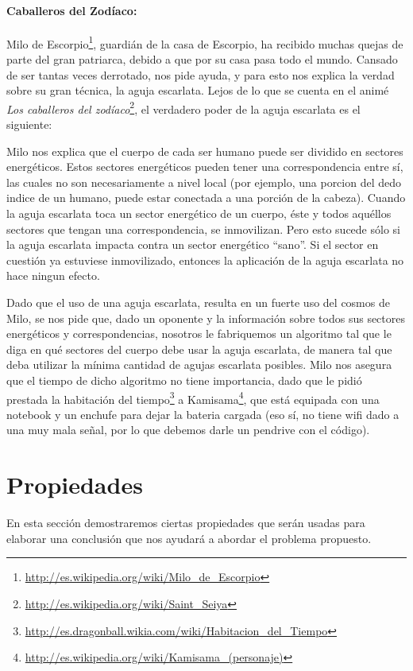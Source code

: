 \documentclass[a4paper]{article}
\begin{document}
\paragraph{Caballeros del Zodíaco:} Milo de Escorpio\footnote{\url{http://es.wikipedia.org/wiki/Milo_de_Escorpio}}, guardián de la casa de Escorpio, ha recibido muchas quejas de parte del gran patriarca, debido a que por su casa pasa todo el mundo. Cansado de ser tantas veces derrotado, nos pide ayuda, y para esto nos explica la verdad sobre su gran técnica, la aguja escarlata. Lejos de lo que se cuenta en el animé {\it Los caballeros del zodíaco}\footnote{\url{http://es.wikipedia.org/wiki/Saint_Seiya}}, el verdadero poder de la aguja escarlata es el siguiente:

Milo nos explica que el cuerpo de cada ser humano puede ser dividido en sectores energéticos.  Estos sectores energéticos pueden tener una correspondencia entre sí, las cuales no son necesariamente a nivel local (por ejemplo, una porcion del dedo indice de un humano, puede estar conectada a una porción de la cabeza). %
Cuando la aguja escarlata toca un sector energético de un cuerpo, éste y todos aquéllos sectores que tengan una correspondencia, se inmovilizan. Pero esto sucede sólo si la aguja escarlata impacta contra un sector energético ``sano''. Si el sector en cuestión ya estuviese inmovilizado, entonces la aplicación de la aguja escarlata no hace ningun efecto.

Dado que el uso de una aguja escarlata, resulta en un fuerte uso del cosmos de Milo, se nos pide que, dado un oponente y la información sobre todos sus sectores energéticos y correspondencias, nosotros le fabriquemos un algoritmo tal que le diga en qué sectores del cuerpo debe usar la aguja escarlata, de manera tal que deba utilizar la mínima cantidad de agujas escarlata posibles. Milo nos asegura que el tiempo de dicho algoritmo no tiene importancia, dado que le pidió prestada la habitación del tiempo\footnote{\url{http://es.dragonball.wikia.com/wiki/Habitacion_del_Tiempo}} a Kamisama\footnote{\url{http://es.wikipedia.org/wiki/Kamisama_(personaje)}}, que está equipada con una notebook y un enchufe para dejar la bateria cargada (eso sí, no tiene wifi dado a una muy mala señal, por lo que debemos darle un pendrive con el código).


\vspace*{0.6cm}

\section{Propiedades}
\vspace*{0.3cm}
En esta sección demostraremos ciertas propiedades que serán usadas para elaborar una conclusión que nos ayudará a abordar el problema propuesto.
\end{document}
